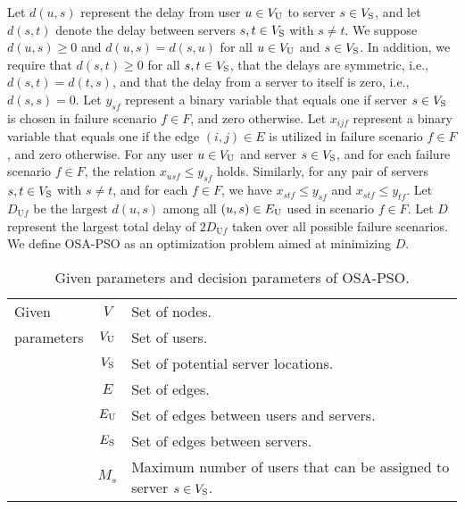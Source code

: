 \documentclass[10pt, letterpaper]{IEEEtran}
\begin{document}
\begin{CJK}{UTF8}{ipxm}
Let $d(u,s)$ represent the delay from user $u \in V_{\rm{U}}$ to server $s \in V_{\rm{S}}$, and let $d(s,t)$ denote the delay between servers $s, t \in V_{\rm{S}}$ with $s \neq t$.
We suppose $d(u,s) \geq 0$ and $d(u,s) = d(s,u)$ for all $u \in V_{\rm{U}}$ and $s \in V_{\rm{S}}$.
In addition, we require that $d(s,t) \geq 0$ for all $s, t \in V_{\rm{S}}$, that the delays are symmetric, i.e., $d(s,t) = d(t,s)$, and that the delay from a server to itself is zero, i.e., $d(s,s) = 0$.
Let $y_{sf}$ represent a binary variable that equals one if server $s \in V_{\rm{S}}$ is chosen in failure scenario $f \in F$, and zero otherwise.
Let $x_{ijf}$ represent a binary variable that equals one if the edge $(i,j) \in E$ is utilized in failure scenario $f \in F$, and zero otherwise.
For any user $u \in V_{\rm{U}}$ and server $s \in V_{\rm{S}}$, and for each failure scenario $f \in F$, the relation $x_{usf} \le y_{sf}$ holds. 
Similarly, for any pair of servers $s, t \in V_{\rm{S}}$ with $s \neq t$, and for each $f \in F$, we have $x_{stf} \le y_{sf}$ and $x_{stf} \le y_{tf}$. 
Let $D_{\mathrm{U}f}$ be the largest $d(u,s)$ among all $(u,s) \in E_{\rm{U}}$ used in scenario $f \in F$.
Let $D$ represent the largest total delay of $2D_{\mathrm{U}f}$ taken over all possible failure scenarios.
We define OSA-PSO as an optimization problem aimed at minimizing $D$.
% 
\begin{table}[tb]
    \centering
    \caption{Given parameters and decision parameters of OSA-PSO.}
    \label{tbl:notation_OSA-PSO}
    \begin{tabular}{p{1.3cm}|cp{5.4cm}}
        \hline
        \small
        Given & $V$ & Set of nodes. \\
        parameters & $V_{\rm{U}}$ & Set of users. \\
        & $V_{\rm{S}}$ & Set of potential server locations. \\
        & $E$ & Set of edges. \\
        & $E_{\rm{U}}$ & Set of edges between users and servers. \\
        & $E_{\rm{S}}$ & Set of edges between servers. \\
        & $M_s$ & Maximum number of users that can be assigned to server $s \in V_{\rm{S}}$. \\

\end{tabular}
\end{table}
\end{CJK}
\end{document}
